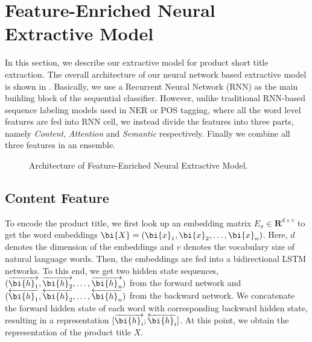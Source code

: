 \section{Feature-Enriched Neural Extractive Model}
\label{sec:model}
In this section, we describe our extractive model for product short title extraction. 
The overall architecture of our neural network based extractive model is shown in .
Basically, we use a Recurrent Neural Network (RNN) as the main building block of the sequential classifier. 
However, unlike traditional RNN-based sequence labeling models used in NER or 
POS tagging, where all the word level features are fed into RNN cell, 
we instead divide the features into three parts, 
namely \emph{Content}, \emph{Attention} and \emph{Semantic} respectively. 
Finally we combine all three features in an ensemble.

\begin{figure}[h]
	\centering
	\caption{Architecture of Feature-Enriched Neural Extractive Model.}
	\label{fig:overview}
\end{figure}

\subsection{Content Feature}

To encode the product title, we first look up an embedding matrix $E_x\in \textbf{R}^{d\times v}$ to get the word embeddings $\bi{X}=(\bi{x}_1, \bi{x}_2, \dots, \bi{x}_n)$. 
Here, $d$ denotes the dimension of the embeddings and $v$ denotes the vocabulary size of natural language words. Then, the embeddings are fed into a bidirectional LSTM networks. 
To this end, we get two hidden state sequences, $(\overrightarrow{\bi{h}_1}, \overrightarrow{\bi{h}_2}, \dots, \overrightarrow{\bi{h}_n})$ from the forward network and $(\overleftarrow{\bi{h}_1}, \overleftarrow{\bi{h}_2}, \dots, \overleftarrow{\bi{h}_n})$ from the
backward network. 
We concatenate the forward hidden state of each word with corresponding backward hidden state, 
resulting in a representation $[\overrightarrow{\bi{h}_i};\overleftarrow{\bi{h}_i}]$. 
At this point, we obtain the representation of the product title $X$.

